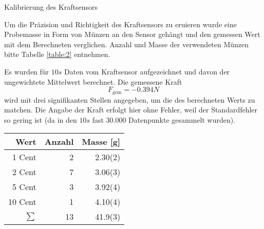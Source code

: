 \documentclass{alex_gp}
\begin{document}
\begin{mybox}{Kalibrierung des Kraftsensors}
	\begin{vwcol}[widths={0.6,0.4}, sep=.8cm, justify=flush,rule=0pt, indent=1em] 
		Um die Präzision und Richtigkeit des Kraftsensors zu eruieren wurde eine Probemasse in Form von Münzen an den Sensor gehängt und den gemessen Wert mit dem Berechneten verglichen. Anzahl und Masse der verwendeten Münzen bitte Tabelle \ref{table:2} entnehmen.\par
		Es wurden für \( 10 \unit{s} \) Daten vom  Kraftsensor aufgezeichnet und davon der ungewichtete Mittelwert berechnet. Die gemessene Kraft 
		\begin{equation}
			F_{\text{gem}} = -0.394 \unit{N}
		\end{equation}
		wird mit drei signifikanten Stellen angegeben, um die des berechneten Werts zu matchen. Die Angabe der Kraft erfolgt hier ohne Fehler, weil der Standardfehler so gering ist (da in den \( 10 \unit{s} \) fast 30.000 Datenpunkte gesammelt wurden).
		\newpage
		\begin{minipage}{0.35\textwidth}
			\begin{tabular}{@{} rrr @{}}\toprule
				Wert & Anzahl & Masse [g] \\ \midrule
				1 Cent & 2 & 2.30(2) \\
				2 Cent & 7 & 3.06(3) \\
				5 Cent & 3 & 3.92(4) \\
				10 Cent & 1 & 4.10(4) \\
				\midrule
				\( \sum \) & 13 & 41.9(3) \\
				\bottomrule
			\end{tabular}
			\label{table:2}
		\end{minipage}
	\end{vwcol}
	
\end{mybox}
\end{document}
